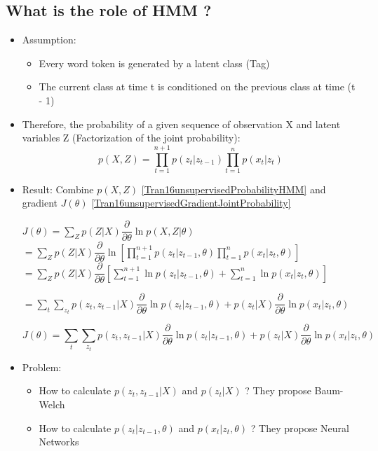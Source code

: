 \documentclass{article}
\begin{document}
\subsection{What is the role of HMM ?}
\begin{itemize}
\item Assumption:
	\begin{itemize}
	\item Every word token is generated by a latent class (Tag)
	\item The current class at time t is conditioned on the previous class at time (t - 1)
	\end{itemize}

\item Therefore, the probability of a given sequence of observation X and latent variables Z (Factorization of the joint probability):
	\begin{equation}
	p(X,Z) = \prod_{t=1}^{n + 1} p(z_{t}|z_{t-1})\prod_{t=1}^{n} p(x_{t}|z_{t})
	\label{Tran16unsupervisedProbabilityHMM}
	\end{equation}
	
\item Result: Combine $p(X,Z)$ \eqref{Tran16unsupervisedProbabilityHMM} and gradient $J(\theta)$ \eqref{Tran16unsupervisedGradientJointProbability}

$J(\theta) = \sum_{Z} p(Z|X) \dfrac{\partial}{\partial\theta} \ln p(X,Z| \theta)$ \\

$ = \sum_{Z} p(Z|X) \dfrac{\partial}{\partial\theta} \ln [\prod_{t=1}^{n + 1} p(z_{t}|z_{t-1},\theta)\prod_{t=1}^{n} p(x_{t}|z_{t},\theta) ]$ \\

$ = \sum_{Z} p(Z|X) \dfrac{\partial}{\partial\theta}  [\sum_{t=1}^{n + 1} \ln p(z_{t}|z_{t-1},\theta) + \sum_{t=1}^{n} \ln p(x_{t}|z_{t},\theta) ]$

$ = \sum_{t}\sum_{z_{t}} p(z_{t}, z_{t-1}|X) \dfrac{\partial}{\partial\theta} \ln p(z_{t}|z_{t-1},\theta) + p(z_{t}|X) \dfrac{\partial}{\partial\theta} \ln p(x_{t}|z_{t},\theta) $

\begin{equation}
	J(\theta) = \sum_{t}\sum_{z_{t}} p(z_{t}, z_{t-1}|X) \dfrac{\partial}{\partial\theta} \ln p(z_{t}|z_{t-1},\theta) + p(z_{t}|X) \dfrac{\partial}{\partial\theta} \ln p(x_{t}|z_{t},\theta)
\end{equation}

\item Problem:
	\begin{itemize}
	\item How to calculate $p(z_{t}, z_{t-1}|X)$ and $p(z_{t}|X)$ ? They propose Baum-Welch
	\item How to calculate $p(z_{t}|z_{t-1},\theta)$ and $p(x_{t}|z_{t},\theta)$ ? They propose Neural Networks
	\end{itemize}
\end{itemize}
\end{document}
